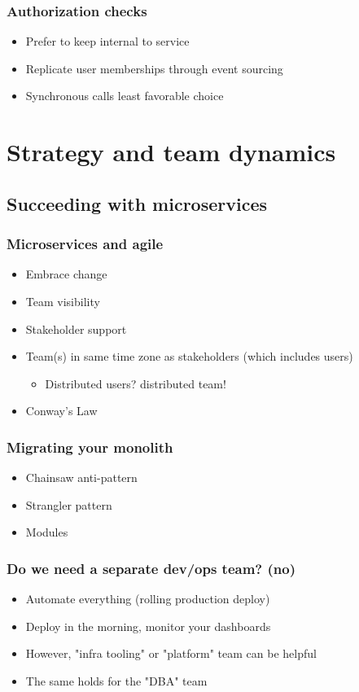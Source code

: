 \documentclass[8pt]{article}
\begin{document}
\subsubsection{Authorization checks}
\label{sec:org7b31e7e}
\begin{itemize}
\item Prefer to keep internal to service
\item Replicate user memberships through event sourcing
\item Synchronous calls least favorable choice
\end{itemize}
\section{Strategy and team dynamics}
\label{sec:orgade6fc5}
\subsection{Succeeding with microservices}
\label{sec:org0ab2d21}
\subsubsection{Microservices and agile}
\label{sec:orgcfa886c}
\begin{itemize}
\item Embrace change
\item Team visibility
\item Stakeholder support
\item Team(s) in same time zone as stakeholders (which includes users)
\begin{itemize}
\item Distributed users? distributed team!
\end{itemize}
\item Conway's Law
\end{itemize}
\subsubsection{Migrating your monolith}
\label{sec:org5ce7439}
\begin{itemize}
\item Chainsaw anti-pattern
\item Strangler pattern
\item Modules
\end{itemize}
\subsubsection{Do we need a separate dev/ops team? (no)}
\label{sec:orga9e3d6f}
\begin{itemize}
\item Automate everything (rolling production deploy)
\item Deploy in the morning, monitor your dashboards
\item However, "infra tooling" or "platform" team can be helpful
\item The same holds for the "DBA" team
\end{itemize}
\end{document}
